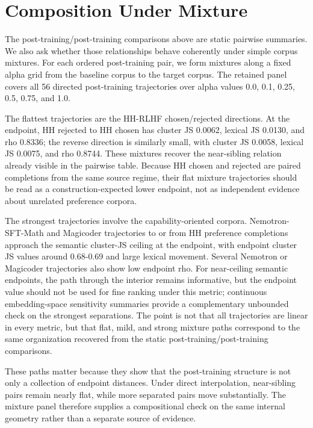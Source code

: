 \documentclass[11pt]{article}
\begin{document}
\section{Composition Under Mixture}\label{composition-under-mixture}

The post-training/post-training comparisons above are static pairwise summaries. We also ask whether those relationships behave coherently under simple corpus mixtures. For each ordered post-training pair, we form mixtures along a fixed alpha grid from the baseline corpus to the target corpus. The retained panel covers all 56 directed post-training trajectories over alpha values 0.0, 0.1, 0.25, 0.5, 0.75, and 1.0.

The flattest trajectories are the HH-RLHF chosen/rejected directions. At the endpoint, HH rejected to HH chosen has cluster JS 0.0062, lexical JS 0.0130, and rho 0.8336; the reverse direction is similarly small, with cluster JS 0.0058, lexical JS 0.0075, and rho 0.8744. These mixtures recover the near-sibling relation already visible in the pairwise table. Because HH chosen and rejected are paired completions from the same source regime, their flat mixture trajectories should be read as a construction-expected lower endpoint, not as independent evidence about unrelated preference corpora.

The strongest trajectories involve the capability-oriented corpora. Nemotron-SFT-Math and Magicoder trajectories to or from HH preference completions approach the semantic cluster-JS ceiling at the endpoint, with endpoint cluster JS values around 0.68-0.69 and large lexical movement. Several Nemotron or Magicoder trajectories also show low endpoint rho. For near-ceiling semantic endpoints, the path through the interior remains informative, but the endpoint value should not be used for fine ranking under this metric; continuous embedding-space sensitivity summaries provide a complementary unbounded check on the strongest separations. The point is not that all trajectories are linear in every metric, but that flat, mild, and strong mixture paths correspond to the same organization recovered from the static post-training/post-training comparisons.

These paths matter because they show that the post-training structure is not only a collection of endpoint distances. Under direct interpolation, near-sibling pairs remain nearly flat, while more separated pairs move substantially. The mixture panel therefore supplies a compositional check on the same internal geometry rather than a separate source of evidence.
\end{document}
